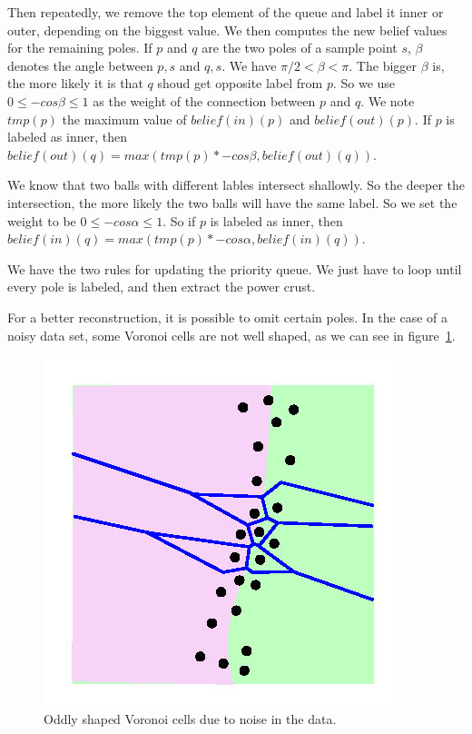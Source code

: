 \documentclass[12pt]{article}
\begin{document}
Then repeatedly, we remove the top element of the queue and label it inner or outer, depending on the biggest value. We then computes the new belief values for the remaining poles. If $p$ and $q$ are the two poles of a sample point $s$, $\beta$ denotes the angle between $p,s$ and $q,s$. We have $\pi/2 < \beta < \pi$. The bigger $\beta$ is, the more likely it is that $q$ shoud get opposite label from $p$. So we use $0 \le -cos\beta \le 1$ as the weight of the connection between $p$ and $q$. We note $tmp(p)$ the maximum value of $belief(in)(p)$ and $belief(out)(p)$. If $p$ is labeled as inner, then $belief(out)(q) = max(tmp(p)*-cos\beta, belief(out)(q))$.

We know that two balls with different lables intersect shallowly. So the deeper the intersection, the more likely the two balls will have the same label. So we set the weight to be $0 \le -cos\alpha \le 1$. So if $p$ is labeled as inner, then $belief(in)(q) = max(tmp(p)*-cos\alpha, belief(in)(q))$.

We have the two rules for updating the priority queue. We just have to loop until every pole is labeled, and then extract the power crust.

For a better reconstruction, it is possible to omit certain poles. In the case of a noisy data set, some Voronoi cells are not well shaped, as we can see in figure~\ref{noisePC}.
\begin{figure}[h]
  \centering
  \includegraphics[scale=0.3]{noise.jpg}
  \caption{\label{noisePC} Oddly shaped Voronoi cells due to noise in the data.}
\end{figure}
\end{document}
